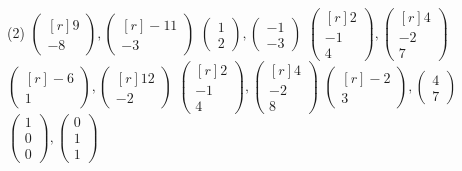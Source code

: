 \begin{tasks}[
    start=68,
    style=enumerate,
    item-indent = 0.9cm,
    label-offset = 3mm,
    ](2)
    \task $\begin{pmatrix*}[r]9 \\ -8\end{pmatrix*},\begin{pmatrix*}[r]-11 \\ -3\end{pmatrix*}$
    \task $\begin{pmatrix*}1 \\ 2\end{pmatrix*},\begin{pmatrix*}-1 \\ -3\end{pmatrix*}$
    \task $\begin{pmatrix*}[r]2 \\ -1 \\ 4\end{pmatrix*},\begin{pmatrix*}[r]4 \\ -2 \\ 7\end{pmatrix*}$
    \task $\begin{pmatrix*}[r]-6 \\ 1\end{pmatrix*},\begin{pmatrix*}[r]12 \\ -2\end{pmatrix*}$
    \task $\begin{pmatrix*}[r]2 \\ -1 \\ 4\end{pmatrix*},\begin{pmatrix*}[r]4 \\ -2 \\ 8\end{pmatrix*}$
    \task $\begin{pmatrix*}[r]-2 \\ 3\end{pmatrix*},\begin{pmatrix*}4 \\ 7\end{pmatrix*}$
    \task $\begin{pmatrix*}1 \\ 0 \\ 0\end{pmatrix*},\begin{pmatrix*}0 \\ 1 \\ 1\end{pmatrix*}$

\end{tasks}
